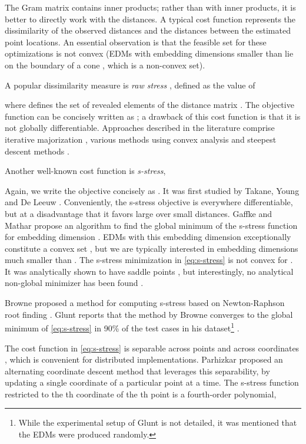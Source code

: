 \documentclass[10pt,double]{IEEEtran}
\begin{document}
The Gram matrix contains inner products; rather than with inner products, it
is better to directly work with the distances. A typical cost function
represents the dissimilarity of the observed distances and the distances
between the estimated point locations. An essential observation is that the feasible
set for these optimizations is not convex (EDMs with embedding dimensions
smaller than  lie on the boundary of a cone \cite{Dattorro:2011wa}, which
is a non-convex set).

A popular dissimilarity measure is \emph{raw stress}
\cite{kruskal1964b}, defined as the value of 

where  defines the set of revealed elements of the distance matrix .
The objective function can be concisely written as ; a drawback of this cost function is that it
is not globally differentiable. Approaches described in the
literature comprise iterative majorization \cite{DeLeeuw1977}, various methods
using convex analysis \cite{mathar1991} and steepest descent methods
\cite{guttman1968}.

Another well-known cost function is \emph{s-stress},

Again, we write the objective concisely as . It was first studied by Takane, Young and De Leeuw
\cite{takane1977}. Conveniently, the s-stress objective is everywhere
differentiable, but at a disadvantage that it favors large over small
distances. Gaffke and Mathar \cite{gaffke1989} propose an algorithm to find
the global minimum of the s-stress function for embedding dimension .
EDMs with this embedding dimension exceptionally constitute a convex set
\cite{Dattorro:2011wa}, but we are typically interested in embedding
dimensions much smaller than . The s-stress minimization in
\eqref{eq:s-stress} is not convex for . It was analytically shown to
have saddle points \cite{rezathesis13}, but interestingly, no analytical
non-global minimizer has been found \cite{rezathesis13}.

Browne proposed a method for computing s-stress based on Newton-Raphson root
finding \cite{Browne1987}. Glunt reports that the method by Browne  converges
to the global minimum of \eqref{eq:s-stress} in 90\% of the test cases in his
dataset\footnote{While the experimental setup of Glunt
\cite{gluntEmbedding1991} is not detailed, it was mentioned that the EDMs were
produced randomly.} \cite{gluntEmbedding1991}.

The cost function in \eqref{eq:s-stress} is separable across points  and
across coordinates , which is convenient for distributed implementations.
Parhizkar \cite{rezathesis13} proposed an alternating coordinate descent
method that leverages this separability, by updating a single coordinate of a
particular point at a time. The s-stress function restricted to the th
coordinate of the th point is a fourth-order polynomial,
\end{document}
